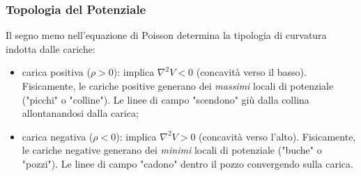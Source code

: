 \documentclass[a4paper,11pt]{report}
\begin{document}
\subsubsection{Topologia del Potenziale}
Il segno meno nell'equazione di Poisson determina la tipologia di curvatura indotta dalle cariche:
\begin{itemize}
    \item {carica positiva ($\rho > 0$):} implica $\nabla^2 V < 0$ (concavità verso il basso).
    Fisicamente, le cariche positive generano dei \textit{massimi} locali di potenziale ("picchi" o "colline"). Le linee di campo "scendono" giù dalla collina allontanandosi dalla carica;
    
    \item {carica negativa ($\rho < 0$):} implica $\nabla^2 V > 0$ (concavità verso l'alto).
    Fisicamente, le cariche negative generano dei \textit{minimi} locali di potenziale ("buche" o "pozzi"). Le linee di campo "cadono" dentro il pozzo convergendo sulla carica.
\end{itemize}
\end{document}
